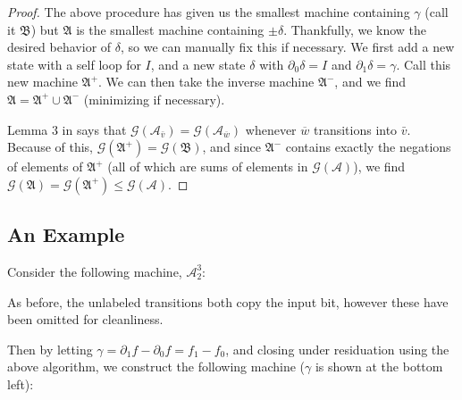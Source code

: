 \documentclass[final]{ws-ijac}
\newcommand{\A}{\mathcal{A}}
\newcommand{\G}{\mathcal{G}}
\renewcommand{\P}{\mathfrak{A}}
\newcommand{\2}{\textbf{2}}
\newcommand{\del}{\partial}
\newcommand{\vv}{\bar{v}}
\begin{document}
\begin{proof}
  The above procedure has given us the smallest machine containing $\gamma$
  (call it $\mathfrak{B}$) but $\P$ is the smallest machine containing $\pm \delta$. 
  Thankfully, we know the desired behavior of $\delta$, so we
  can manually fix this if necessary. We first add a new state with a self 
  loop for $I$, and a new state $\delta$ with $\del_0 \delta = I$ and 
  $\del_1 \delta = \gamma$. Call this new machine $\P^+$. We can then take the
  inverse machine $\P^-$, and we find $\P = \P^+ \cup \P^-$ (minimizing if
  necessary).

  Lemma $3$ in \cite{Sutner18:abelian_automata} says that 
  $\G(\A_{\vv}) = \G(\A_{\overline{w}})$ whenever $\overline{w}$ transitions 
  into $\vv$. Because of this, $\G(\P^+) = \G(\mathfrak{B})$, and since 
  $\P^-$ contains exactly the negations of elements of $\P^+$ (all of which are 
  sums of elements in $\G(\A)$), we find $\G(\P) = \G(\P^+) \leq \G(\A)$.
\end{proof}

\subsection{An Example}
Consider the following machine, $\A^3_2$:

\begin{center}
\end{center}

As before, the unlabeled transitions both copy the input bit, however these
have been omitted for cleanliness.

Then by letting $\gamma = \del_1 f - \del_0 f = f_1 - f_0$, and closing
under residuation using the above algorithm, we construct the following 
machine ($\gamma$ is shown at the bottom left): 
\end{document}
